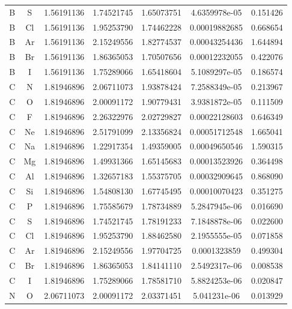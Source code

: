 \begin{longtable}{@{}ccccccc@{}}
B  &  S     &     1.56191136   &   1.74521745  &    1.65073751 &  4.6359978e-05  &  0.151426\\
B  &  Cl    &     1.56191136   &   1.95253790  &    1.74462228 &  0.00019882685  &  0.668654\\
B  &  Ar    &     1.56191136   &   2.15249556  &    1.82774537 &  0.00043254436  &  1.644894\\
B  &  Br    &     1.56191136   &   1.86365053  &    1.70507656 &  0.00012232055  &  0.422076\\
B  &  I     &     1.56191136   &   1.75289066  &    1.65418604 &  5.1089297e-05  &  0.186574\\
C  &  N     &     1.81946896   &   2.06711073  &    1.93878424 &  7.2588349e-05  &  0.213967\\
C  &  O     &     1.81946896   &   2.00091172  &    1.90779431 &  3.9381872e-05  &  0.111509\\
C  &  F     &     1.81946896   &   2.26322976  &    2.02729827 &  0.00022128603  &  0.646349\\
C  &  Ne    &     1.81946896   &   2.51791099  &    2.13356824 &  0.00051712548  &  1.665041\\
C  &  Na    &     1.81946896   &   1.22917354  &    1.49359005 &  0.00049650546  &  1.590315\\
C  &  Mg    &     1.81946896   &   1.49931366  &    1.65145683 &  0.00013523926  &  0.364498\\
C  &  Al    &     1.81946896   &   1.32657183  &    1.55375705 &  0.00032909645  &  0.868090\\
C  &  Si    &     1.81946896   &   1.54808130  &    1.67745495 &  0.00010070423  &  0.351275\\
C  &  P     &     1.81946896   &   1.75585679  &    1.78734889 &  5.2847945e-06  &  0.016690\\
C  &  S     &     1.81946896   &   1.74521745  &    1.78191233 &  7.1848878e-06  &  0.022600\\
C  &  Cl    &     1.81946896   &   1.95253790  &    1.88462580 &  2.1955555e-05  &  0.071858\\
C  &  Ar    &     1.81946896   &   2.15249556  &    1.97704725 &   0.0001323859  &  0.499304\\
C  &  Br    &     1.81946896   &   1.86365053  &    1.84141110 &  2.5492317e-06  &  0.008538\\
C  &  I     &     1.81946896   &   1.75289066  &    1.78581710 &  5.8824253e-06  &  0.020847\\
N  &  O     &     2.06711073   &   2.00091172  &    2.03371451 &   5.041231e-06  &  0.013929\\

\end{longtable}

